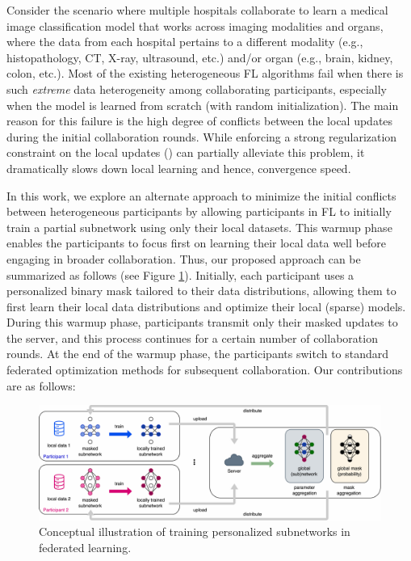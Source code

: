 \documentclass{article}
\begin{document}
Consider the scenario where multiple hospitals collaborate to learn a medical image classification model that works across imaging modalities and organs, where the data from each hospital pertains to a different modality (e.g., histopathology, CT, X-ray, ultrasound, etc.) and/or organ (e.g., brain, kidney, colon, etc.). Most of the existing heterogeneous FL algorithms fail when there is such \textit{extreme} data heterogeneity among collaborating participants, especially when the model is learned from scratch (with random initialization). The main reason for this failure is the high degree of conflicts between the local updates during the initial collaboration rounds. While enforcing a strong regularization constraint on the local updates (\cite{li2020federated}) can partially alleviate this problem, it dramatically slows down local learning and hence, convergence speed. 

In this work, we explore an alternate approach to minimize the initial conflicts between heterogeneous participants by allowing participants in FL to initially train a partial subnetwork using only their local datasets. This warmup phase enables the participants to focus first on learning their local data well before engaging in broader collaboration. Thus, our proposed approach can be summarized as follows (see Figure \ref{fig: main-figure}). Initially, each participant uses a personalized binary mask tailored to their data distributions, allowing them to first learn their local data distributions and optimize their local (sparse) models. During this warmup phase, participants transmit only their masked updates to the server, and this process continues for a certain number of collaboration rounds. At the end of the warmup phase, the participants switch to standard federated optimization methods for subsequent collaboration. Our contributions are as follows:

\begin{figure}[t!]
    \centering
    \includegraphics[width=\linewidth]{images/main_scheme_v4.pdf} 
    \caption{Conceptual illustration of training personalized subnetworks in federated learning.}
    \label{fig: main-figure}
\end{figure}
\end{document}
